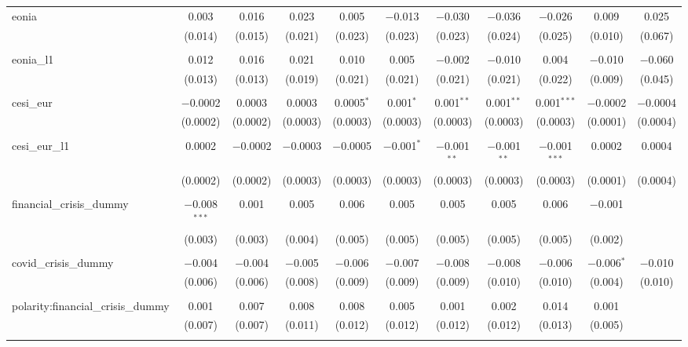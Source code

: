 \begin{table}[!htbp]
\begin{adjustbox}{width=1.25\textwidth}
\begin{tabular}{@{\extracolsep{5pt}}lcccccccccc}
 eonia & 0.003 & 0.016 & 0.023 & 0.005 & $-$0.013 & $-$0.030 & $-$0.036 & $-$0.026 & 0.009 & 0.025 \\ 
  & (0.014) & (0.015) & (0.021) & (0.023) & (0.023) & (0.023) & (0.024) & (0.025) & (0.010) & (0.067) \\ 
  & & & & & & & & & & \\ 
 eonia\_l1 & 0.012 & 0.016 & 0.021 & 0.010 & 0.005 & $-$0.002 & $-$0.010 & 0.004 & $-$0.010 & $-$0.060 \\ 
  & (0.013) & (0.013) & (0.019) & (0.021) & (0.021) & (0.021) & (0.021) & (0.022) & (0.009) & (0.045) \\ 
  & & & & & & & & & & \\ 
 cesi\_eur & $-$0.0002 & 0.0003 & 0.0003 & 0.0005$^{*}$ & 0.001$^{*}$ & 0.001$^{**}$ & 0.001$^{**}$ & 0.001$^{***}$ & $-$0.0002 & $-$0.0004 \\ 
  & (0.0002) & (0.0002) & (0.0003) & (0.0003) & (0.0003) & (0.0003) & (0.0003) & (0.0003) & (0.0001) & (0.0004) \\ 
  & & & & & & & & & & \\ 
 cesi\_eur\_l1 & 0.0002 & $-$0.0002 & $-$0.0003 & $-$0.0005 & $-$0.001$^{*}$ & $-$0.001$^{**}$ & $-$0.001$^{**}$ & $-$0.001$^{***}$ & 0.0002 & 0.0004 \\ 
  & (0.0002) & (0.0002) & (0.0003) & (0.0003) & (0.0003) & (0.0003) & (0.0003) & (0.0003) & (0.0001) & (0.0004) \\ 
  & & & & & & & & & & \\ 
 financial\_crisis\_dummy & $-$0.008$^{***}$ & 0.001 & 0.005 & 0.006 & 0.005 & 0.005 & 0.005 & 0.006 & $-$0.001 &  \\ 
  & (0.003) & (0.003) & (0.004) & (0.005) & (0.005) & (0.005) & (0.005) & (0.005) & (0.002) &  \\ 
  & & & & & & & & & & \\ 
 covid\_crisis\_dummy & $-$0.004 & $-$0.004 & $-$0.005 & $-$0.006 & $-$0.007 & $-$0.008 & $-$0.008 & $-$0.006 & $-$0.006$^{*}$ & $-$0.010 \\ 
  & (0.006) & (0.006) & (0.008) & (0.009) & (0.009) & (0.009) & (0.010) & (0.010) & (0.004) & (0.010) \\ 
  & & & & & & & & & & \\ 
 polarity:financial\_crisis\_dummy & 0.001 & 0.007 & 0.008 & 0.008 & 0.005 & 0.001 & 0.002 & 0.014 & 0.001 &  \\ 
  & (0.007) & (0.007) & (0.011) & (0.012) & (0.012) & (0.012) & (0.012) & (0.013) & (0.005) &  \\ 
  & & & & & & & & & & \\ 

\end{tabular}
\end{adjustbox}
\end{table}
